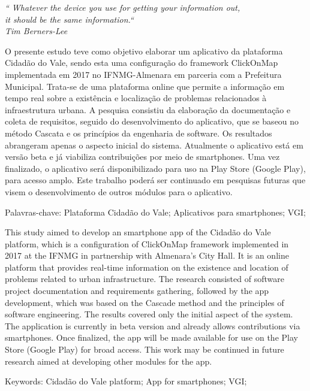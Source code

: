 \documentclass[
12pt,				 %
openright,           %
oneside,			 %
a4paper,			 %
sumario=tradicional, %
chapter=TITLE,		 %
fleqn,				 %
english,
spanish,
brazil,				 %
]{abntex2}%
\begin{document}

\begin{epigrafe}
	\vspace*{\fill}
	\begin{flushright}
		\textit{`` Whatever the device you use for getting your information out, \\ it should be the same information.``\\
			Tim Berners-Lee}
	\end{flushright}
\end{epigrafe}

\begin{resumo}	
	O presente estudo teve como objetivo elaborar um aplicativo da plataforma Cidadão do Vale, sendo esta uma configuração do framework ClickOnMap implementada em 2017 no IFNMG-Almenara em parceria com a Prefeitura Municipal. Trata-se de uma plataforma online que permite a informação em tempo real sobre a existência e localização de problemas relacionados à infraestrutura urbana. A pesquisa consistiu da elaboração da documentação e coleta de requisitos, seguido do desenvolvimento do aplicativo, que se baseou no método Cascata e os princípios da engenharia de software. Os resultados abrangeram apenas o aspecto inicial do sistema. Atualmente o aplicativo está em versão beta e já viabiliza contribuições por meio de smartphones. Uma vez finalizado, o aplicativo será disponibilizado para uso na Play Store (Google Play), para acesso amplo. Este trabalho poderá ser continuado em pesquisas futuras que visem o desenvolvimento de outros módulos para o aplicativo.
	
	Palavras-chave: Plataforma Cidadão do Vale; Aplicativos para smartphones; VGI;


\end{resumo}

\begin{resumo}[abstract]
   This study aimed to develop an smartphone app of the Cidadão do Vale platform, which is a configuration of ClickOnMap framework implemented in 2017 at the IFNMG in partnership with Almenara's City Hall. It is an online platform that provides real-time information on the existence and location of problems related to urban infrastructure. The research consisted of software project documentation and requirements gathering, followed by the app development, which was based on the Cascade method and the principles of software engineering. The results covered only the initial aspect of the system. The application is currently in beta version and already allows contributions via smartphones. Once finalized, the app will be made available for use on the Play Store (Google Play) for broad access. This work may be continued in future research aimed at developing other modules for the app.
   
   Keywords: Cidadão do Vale platform; App for smartphones; VGI;

\end{resumo}
\end{document}

